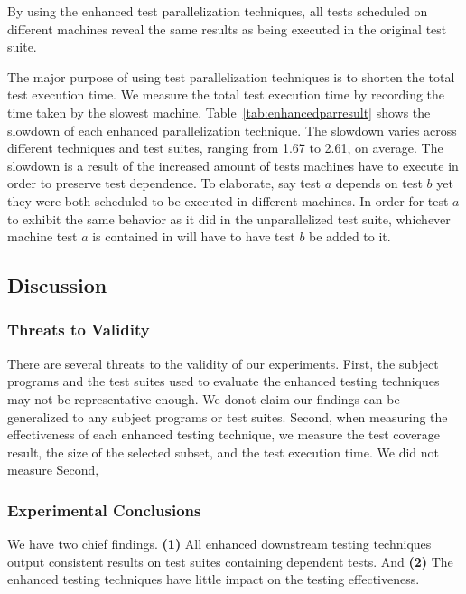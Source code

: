By using the enhanced test parallelization techniques,
all tests scheduled on different machines reveal the
same results as being executed in the original test suite.

The major purpose of using test parallelization techniques is
to shorten the total test execution time. We measure the total
test execution time by recording the time taken by the slowest
machine. Table~\ref{tab:enhancedparresult} shows the
slowdown of each enhanced parallelization technique.
The slowdown varies across different techniques and test suites,
ranging from 1.67 to 2.61, on average. The slowdown is a result
of the increased amount of tests machines have to execute in
order to preserve test dependence. To elaborate, say test $\mathit{a}$
depends on test $\mathit{b}$ yet they were both scheduled
to be executed in different machines. In order for test $\mathit{a}$ to exhibit
the same behavior as it did in the unparallelized test suite, whichever
machine test $\mathit{a}$ is contained in will  have to have test
$\mathit{b}$ be added to it.


\subsection{Discussion}

\subsubsection{Threats to Validity}

There are several threats to the validity
of our experiments. 
First, the subject programs and the test suites
used to evaluate the enhanced testing techniques may
not be representative enough. We donot claim
our findings can be generalized to any subject
programs or test suites. Second,
when measuring the effectiveness of each enhanced
testing technique, we measure the test coverage
result, the size of the selected subset, and
the test execution time. We did not measure
Second,

\subsubsection{Experimental Conclusions}

We have two chief findings. 
\textbf{(1)} All enhanced downstream testing techniques
output consistent results on test suites
containing dependent tests. And \textbf{(2)}
The enhanced testing techniques have
little impact on the testing effectiveness.
